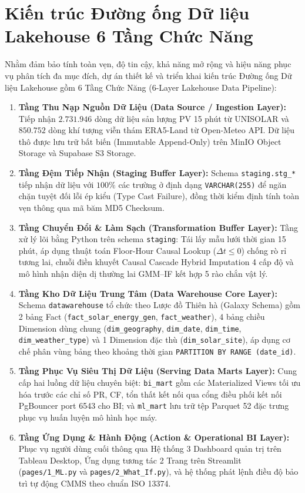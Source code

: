 \documentclass[12pt, a4paper]{report}
\begin{document}
\section{Kiến trúc Đường ống Dữ liệu Lakehouse 6 Tầng Chức Năng}
\label{sec:kientruc_dexuat}

Nhằm đảm bảo tính toàn vẹn, độ tin cậy, khả năng mở rộng và hiệu năng phục vụ phân tích đa mục đích, dự án thiết kế và triển khai kiến trúc Đường ống Dữ liệu Lakehouse gồm 6 Tầng Chức Năng (6-Layer Lakehouse Data Pipeline):

\begin{enumerate}[label=\textbf{Layer \arabic* --}, leftmargin=*]
    \item \textbf{Tầng Thu Nạp Nguồn Dữ Liệu (Data Source / Ingestion Layer):} Tiếp nhận $2.731.946$ dòng dữ liệu sản lượng PV 15 phút từ UNISOLAR và $850.752$ dòng khí tượng viễn thám ERA5-Land từ Open-Meteo API. Dữ liệu thô được lưu trữ bất biến (Immutable Append-Only) trên MinIO Object Storage và Supabase S3 Storage.
    \item \textbf{Tầng Đệm Tiếp Nhận (Staging Buffer Layer):} Schema \texttt{staging.stg\_*} tiếp nhận dữ liệu với $100\%$ các trường ở định dạng \texttt{VARCHAR(255)} để ngăn chặn tuyệt đối lỗi ép kiểu (Type Cast Failure), đồng thời kiểm định tính toàn vẹn thông qua mã băm MD5 Checksum.
    \item \textbf{Tầng Chuyển Đổi \& Làm Sạch (Transformation Buffer Layer):} Tầng xử lý lõi bằng Python trên schema \texttt{staging}: Tái lấy mẫu lưới thời gian 15 phút, áp dụng thuật toán Floor-Hour Causal Lookup ($\Delta t \le 0$) chống rò rỉ tương lai, chuỗi điền khuyết Causal Cascade Hybrid Imputation 4 cấp độ và mô hình nhận diện dị thường lai GMM--IF kết hợp 5 rào chắn vật lý.
    \item \textbf{Tầng Kho Dữ Liệu Trung Tâm (Data Warehouse Core Layer):} Schema \texttt{datawarehouse} tổ chức theo Lược đồ Thiên hà (Galaxy Schema) gồm 2 bảng Fact (\texttt{fact\_solar\_energy\_gen}, \texttt{fact\_weather}), 4 bảng chiều Dimension dùng chung (\texttt{dim\_geography}, \texttt{dim\_date}, \texttt{dim\_time}, \texttt{dim\_weather\_type}) và 1 Dimension đặc thù (\texttt{dim\_solar\_site}), áp dụng cơ chế phân vùng bảng theo khoảng thời gian \texttt{PARTITION BY RANGE (date\_id)}.
    \item \textbf{Tầng Phục Vụ Siêu Thị Dữ Liệu (Serving Data Marts Layer):} Cung cấp hai luồng dữ liệu chuyên biệt: \texttt{bi\_mart} gồm các Materialized Views tối ưu hóa trước các chỉ số PR, CF, tổn thất kết nối qua cổng điều phối kết nối PgBouncer port 6543 cho BI; và \texttt{ml\_mart} lưu trữ tệp Parquet 52 đặc trưng phục vụ huấn luyện mô hình học máy.
    \item \textbf{Tầng Ứng Dụng \& Hành Động (Action \& Operational BI Layer):} Phục vụ người dùng cuối thông qua Hệ thống 3 Dashboard quản trị trên Tableau Desktop, Ứng dụng tương tác 2 Trang trên Streamlit (\texttt{pages/1\_ML.py} và \texttt{pages/2\_What\_If.py}), và hệ thống phát lệnh điều độ bảo trì tự động CMMS theo chuẩn ISO 13374.
\end{enumerate}
\end{document}
